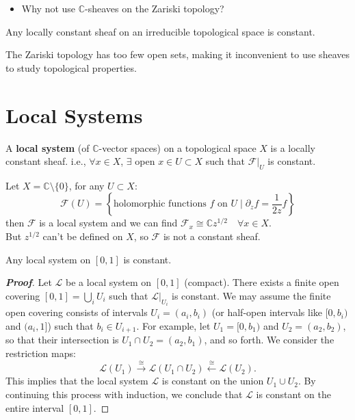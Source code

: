 \begin{itemize}
    \item Why not use $\mathbb{C}$-sheaves on the Zariski topology?
\end{itemize}

\begin{lemma}
Any locally constant sheaf on an irreducible topological space is constant.
\end{lemma}

\begin{remark}
    The Zariski topology has too few open sets, making it inconvenient to use sheaves to study topological properties.
\end{remark}



\section{Local Systems}

\begin{definition}
A \textbf{local system} (of $\mathbb{C}$-vector spaces) on a topological space $X$ is a locally constant sheaf. 
i.e., $\forall x \in X$, $\exists$ open $x \in U \subset X$ such that $\mathcal{F}|_U$ is constant.
\end{definition}

\begin{example}
    Let $X = \mathbb{C} \setminus \{0\}$, for any $U \subset X$:
\[ \mathcal{F}(U) = \left\{ \text{holomorphic functions } f \text{ on } U \mid \partial_z f = \frac{1}{2z} f \right\} \]
then $\mathcal{F}$ is a local system 
and we can find $\mathcal{F}_x \cong \mathbb{C} z^{1/2} \quad \forall x \in X$. \\
But $z^{1/2}$ can't be defined on $X$, so $\mathcal{F}$ is not a constant sheaf.
\end{example}


\begin{lemma}
Any local system on $[0,1]$ is constant.
\end{lemma}

\begin{proof}[\textbf{Proof}]
Let $\mathcal{L}$ be a local system on $[0,1]$ (compact). 
There exists a finite open covering $[0,1] = \bigcup_{i} U_i$ such that $\mathcal{L}|_{U_i}$ is constant.
We may assume the finite open covering consists of intervals $U_i = (a_i, b_i)$ (or half-open intervals like $[0, b_i)$ and $(a_i, 1]$) such that $b_i \in U_{i+1}$. For example, let $U_1 = [0, b_1)$ and $U_2 = (a_2, b_2)$, so that their intersection is $U_1 \cap U_2 = (a_2, b_1)$, and so forth. We consider the restriction maps:
\[ \mathcal{L}(U_1) \xrightarrow{\cong} \mathcal{L}(U_1 \cap U_2) \xleftarrow{\cong} \mathcal{L}(U_2). \]
This implies that the local system $\mathcal{L}$ is constant on the union $U_1 \cup U_2$. By continuing this process with induction, we conclude that $\mathcal{L}$ is constant on the entire interval $[0,1]$.
\end{proof}

